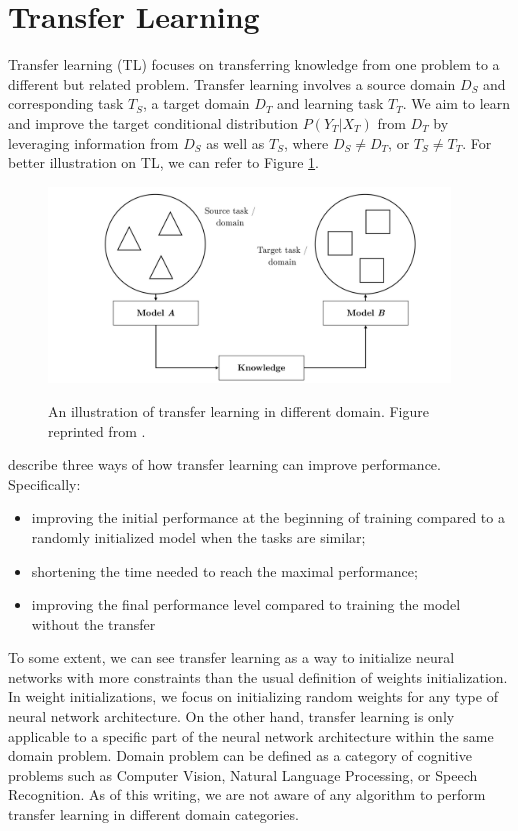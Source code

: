 \section{Transfer Learning}
\label{sec:bm_tl}
Transfer learning (TL) focuses on transferring knowledge from one problem to a different but related problem. Transfer learning involves a source domain $D_S$ and corresponding task $T_S$, a target domain $D_T$ and learning task $T_T$. We aim to learn and improve the target conditional distribution $P(Y_T|X_T)$ from $D_T$ by leveraging information from $D_S$ as well as $T_S$, where $D_S \neq D_T$, or $T_S \neq T_T$. For better illustration on TL, we can refer to Figure \ref{img:transfer_learning}.

\begin{figure}[h]
    {\includegraphics[width=0.95\textwidth]{img/transfer_learning_scenario.png}}
    \centering
    \caption{An illustration of transfer learning in different domain. Figure reprinted from \cite{ruder2019transfer}.}
    \label{img:transfer_learning}
\end{figure}

\cite{shavlik2010transfer} describe three ways of how transfer learning can
improve performance. Specifically:
\begin{itemize}
    \item improving the initial performance at the beginning of training compared
          to a randomly initialized model when the tasks are similar;
    \item shortening the time needed to reach the maximal performance;
    \item improving the final performance level compared to training the model
          without the transfer
\end{itemize}

To some extent, we can see transfer learning as a way to initialize neural networks with more constraints than the usual definition of weights initialization. In weight initializations, we focus on initializing random weights for any type of neural network architecture. On the other hand, transfer learning is only applicable to a specific part of the neural network architecture within the same domain problem. Domain problem can be defined as a category of cognitive problems such as Computer Vision, Natural Language Processing, or Speech Recognition. As of this writing, we are not aware of any algorithm to perform transfer learning in different domain categories.


